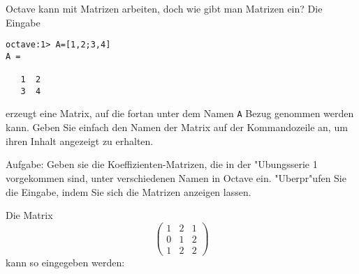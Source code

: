 Octave kann mit Matrizen arbeiten, doch wie gibt man Matrizen ein?
Die Eingabe
\begin{verbatim}
octave:1> A=[1,2;3,4]
A =

   1  2
   3  4
\end{verbatim}
erzeugt eine Matrix, auf die fortan unter dem Namen {\tt A}
Bezug genommen werden kann. Geben Sie einfach den Namen der
Matrix auf der Kommandozeile an, um ihren Inhalt angezeigt zu
erhalten.

Aufgabe: Geben sie die Koeffizienten-Matrizen, die in der "Ubungsserie 1
vorgekommen
sind, unter verschiedenen Namen in Octave ein. "Uberpr"ufen Sie die
Eingabe, indem Sie sich die Matrizen anzeigen lassen.

\begin{loesung}
Die Matrix
\[
\begin{pmatrix}
1&2&1\\
0&1&2\\
1&2&2
\end{pmatrix}
\]
kann so eingegeben werden:
\end{loesung}

